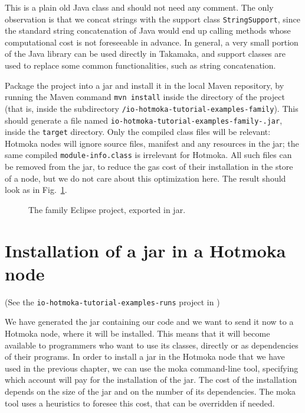 This is a plain old Java class and should not need any comment.
The only observation is that we concat strings
with the support class \texttt{StringSupport},
since the standard string concatenation
of Java would end up
calling methods whose computational cost is not foreseeable in advance. In general,
a very small portion of the
Java library can be used directly in Takamaka,
and support classes are used to replace some common functionalities,
such as string concatenation.

Package the project into a jar and install it in the local Maven repository,
by running the Maven command \texttt{mvn install} inside
the directory of the project (that is, inside the subdirectory
\texttt{\hotmokaTutorialDir{}/io-hotmoka-tutorial-examples-family}).
This should generate a file named
\texttt{io-hotmoka-tutorial-examples-family-\hotmokaVersion{}.jar},
inside the \texttt{target} directory. Only the compiled
class files will be relevant: Hotmoka nodes will ignore source files, manifest
and any resources in the jar; the same compiled
\texttt{module-info.class} is irrelevant for Hotmoka.
All such files can be removed from the jar, to reduce the gas cost of their
installation in the store of a node, but we do not care about this optimization here.
The result should look as in Fig.~\ref{fig:family_jar}.
%
\begin{figure}[t]
  \begin{center}
  \end{center}
  \caption{The family Eclipse project, exported in jar.}
  \label{fig:family_jar}
\end{figure}

\section{Installation of a jar in a Hotmoka node}\label{sec:jar_installation}

\begin{center}
(See the \texttt{io-hotmoka-tutorial-examples-runs} project in \hotmokaRepo{})
\end{center}

We have generated the jar containing our code and we want to send it now to a Hotmoka node,
where it will be installed. This means that it will become available to programmers
who want to use its classes, directly or as dependencies of their programs.
In order to install a jar in the Hotmoka node that we have used in the previous chapter,
we can use the moka command-line tool, specifying which account will pay for the
installation of the jar. The cost of the installation depends on the size of the
jar and on the number of its dependencies. The moka tool uses a heuristics to
foresee this cost, that can be overridden if needed.

